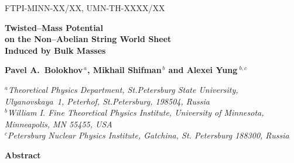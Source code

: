 \documentclass[12pt]{article}
\begin{document}
\begin{titlepage}


\begin{flushright}
FTPI-MINN-XX/XX, UMN-TH-XXXX/XX\\
\end{flushright}


\vspace{1.6cm}
\begin{center}
{\Large \bf  Twisted--Mass Potential \\
	on the Non--Abelian String World Sheet \\[2.4mm]
             Induced by Bulk Masses}
\end{center}



\vspace{2mm}

\begin{center}

 {\large
 \bf   Pavel A.~Bolokhov$^{\,a}$,  Mikhail Shifman$^{\,b}$ and \bf Alexei Yung$^{\,\,b,c}$}
\end {center}

\begin{center}

$^a${\it Theoretical Physics Department, St.Petersburg State University, Ulyanovskaya~1, 
	 Peterhof, St.Petersburg, 198504, Russia}\\
$^b${\it  William I. Fine Theoretical Physics Institute,
University of Minnesota,
Minneapolis, MN 55455, USA}\\
$^c${\it Petersburg Nuclear Physics Institute, Gatchina, St. Petersburg
188300, Russia
}
\end{center}



\vspace{1cm}
\begin{center}
{\large\bf Abstract}
\end{center}


\end{titlepage}
\end{document}
